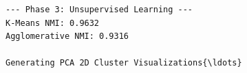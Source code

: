 \documentclass[11pt]{article}
\makeatletter
\newcommand{\boxspacing}{\kern\kvtcb@left@rule\kern\kvtcb@boxsep}
\newcommand{\prompt}[4]{
        {\ttfamily\llap{{\color{#2}[#3]:\hspace{3pt}#4}}\vspace{-\baselineskip}}
    }
\makeatother
\begin{document}
    \begin{Verbatim}[commandchars=\\\{\}]
--- Phase 3: Unsupervised Learning ---
K-Means NMI: 0.9632
Agglomerative NMI: 0.9316

Generating PCA 2D Cluster Visualizations{\ldots}
    \end{Verbatim}

    \begin{center}
    \end{center}
    { \hspace*{\fill} \\}
    
    \begin{tcolorbox}[breakable, size=fbox, boxrule=1pt, pad at break*=1mm,colback=cellbackground, colframe=cellborder]
\prompt{In}{incolor}{ }{\boxspacing}
\begin{Verbatim}[commandchars=\\\{\}]

\end{Verbatim}
\end{tcolorbox}


    
    
    
\end{document}
